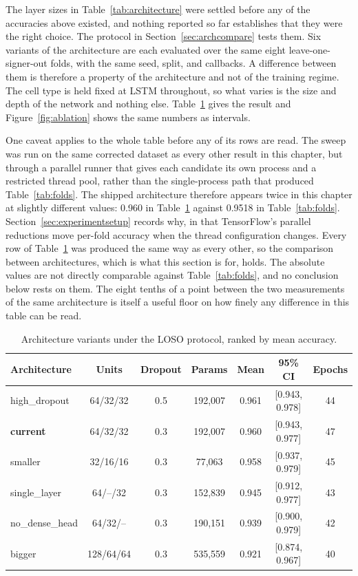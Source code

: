 The layer sizes in Table~\ref{tab:architecture} were settled before any of the accuracies
above existed, and nothing reported so far establishes that they were the right choice. The
protocol in Section~\ref{sec:archcompare} tests them. Six variants of the architecture are
each evaluated over the same eight leave-one-signer-out folds, with the same seed, split, and
callbacks. A difference between them is therefore a property of the architecture and not of
the training regime. The cell type is held fixed at LSTM throughout, so what varies is the
size and depth of the network and nothing else. Table~\ref{tab:ablation} gives the result and
Figure~\ref{fig:ablation} shows the same numbers as intervals.

One caveat applies to the whole table before any of its rows are read. The sweep was run on
the same corrected dataset as every other result in this chapter, but through a parallel
runner that gives each candidate its own process and a restricted thread pool, rather than
the single-process path that produced Table~\ref{tab:folds}. The shipped architecture
therefore appears twice in this chapter at slightly different values: 0.960 in
Table~\ref{tab:ablation} against 0.9518 in Table~\ref{tab:folds}. Section~\ref{sec:experimentsetup}
records why, in that TensorFlow's parallel reductions move per-fold accuracy when the thread
configuration changes. Every row of Table~\ref{tab:ablation} was produced the same way as
every other, so the comparison between architectures, which is what this section is for,
holds. The absolute values are not directly comparable against Table~\ref{tab:folds}, and no
conclusion below rests on them. The eight tenths of a point between the two measurements of
the same architecture is itself a useful floor on how finely any difference in this table can
be read.

\begin{table}[htbp]
    \centering
    \caption{Architecture variants under the LOSO protocol, ranked by mean accuracy.}
    \label{tab:ablation}
    \small
    \setlength{\tabcolsep}{4pt}
    \begin{tabular}{lcccccc}
        \toprule
        \textbf{Architecture} & \textbf{Units} & \textbf{Dropout} & \textbf{Params} & \textbf{Mean} & \textbf{95\% CI} & \textbf{Epochs} \\
        \midrule
        high\_dropout          & 64/32/32   & 0.5 & 192{,}007 & 0.961 & [0.943, 0.978] & 44 \\
        \textbf{current}       & 64/32/32   & 0.3 & 192{,}007 & 0.960 & [0.943, 0.977] & 47 \\
        smaller                & 32/16/16   & 0.3 & 77{,}063  & 0.958 & [0.937, 0.979] & 45 \\
        single\_layer          & 64/--/32   & 0.3 & 152{,}839 & 0.945 & [0.912, 0.977] & 43 \\
        no\_dense\_head        & 64/32/--   & 0.3 & 190{,}151 & 0.939 & [0.900, 0.979] & 42 \\
        bigger                 & 128/64/64  & 0.3 & 535{,}559 & 0.921 & [0.874, 0.967] & 40 \\
        \bottomrule
    \end{tabular}
\end{table}


